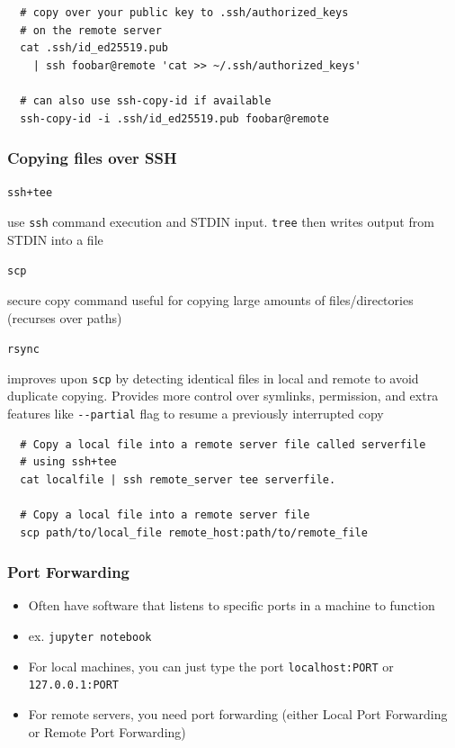 \documentclass[letterpaper,12pt]{article}
\newcommand*{\lstitem}[1]{
  \setbox0\hbox{\lstinline{#1}}
  \item[\usebox0]
}
\begin{document}
\begin{lstlisting}
  # copy over your public key to .ssh/authorized_keys
  # on the remote server
  cat .ssh/id_ed25519.pub
    | ssh foobar@remote 'cat >> ~/.ssh/authorized_keys'

  # can also use ssh-copy-id if available
  ssh-copy-id -i .ssh/id_ed25519.pub foobar@remote
\end{lstlisting}

\subsubsection{Copying files over SSH}
\begin{description}
  \lstitem{ssh+tee} use \lstinline{ssh} command execution and STDIN input. \lstinline{tree} then writes output from STDIN into a file
  \lstitem{scp} secure copy command useful for copying large amounts of files/directories (recurses over paths)
  \lstitem{rsync} improves upon \lstinline{scp} by detecting identical files in local and remote to avoid duplicate copying. Provides more control over symlinks, permission, and extra features like \lstinline{--partial} flag to resume a previously interrupted copy
\end{description}

\begin{lstlisting}
  # Copy a local file into a remote server file called serverfile
  # using ssh+tee
  cat localfile | ssh remote_server tee serverfile.

  # Copy a local file into a remote server file
  scp path/to/local_file remote_host:path/to/remote_file
\end{lstlisting}

\subsubsection{Port Forwarding}
\begin{itemize}
  \item Often have software that listens to specific ports in a machine to function
  \item ex. \lstinline{jupyter notebook}
  \item For local machines, you can just type the port \lstinline{localhost:PORT} or \lstinline{127.0.0.1:PORT}
  \item For remote servers, you need port forwarding (either Local Port Forwarding or Remote Port Forwarding)
\end{itemize}
\end{document}
